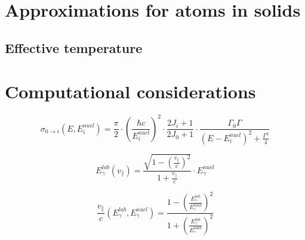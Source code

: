\documentclass{article}
\begin{document}
\section{Approximations for atoms in solids}

\subsection{Effective temperature}





\section{Computational considerations}

\begin{equation}
\label{breit_wigner}
\sigma_{0 \to i} (E, E_i^{nucl}) = \frac{\pi}{2} \cdot \left( \frac{\hbar c}{E_i^{nucl}} \right)^2 \cdot \frac{2 J_i + 1}{2 J_0 + 1} \cdot \frac{\Gamma_0 \Gamma}{\left( E - E_i^{nucl} \right)^2 + \frac{\Gamma^2}{4}}
\end{equation}

\begin{equation}
\label{doppler_shift}
E_\gamma^{lab}(v_\parallel) = \frac{\sqrt{1 - \left( \frac{v_\parallel}{c} \right)^2}}{1 + \frac{v_\parallel}{c}} \cdot E_\gamma^{nucl}
\end{equation}

\begin{equation}
\label{doppler_shift_inverse}
\frac{v_\parallel}{c} \left( E_\gamma^{lab}, E_\gamma^{nucl} \right) = \frac{1 - \left( \frac{E_\gamma^{lab}}{E_\gamma^{nucl}} \right)^2}{1 + \left( \frac{E_\gamma^{lab}}{E_\gamma^{nucl}} \right)^2}
\end{equation}
\end{document}
